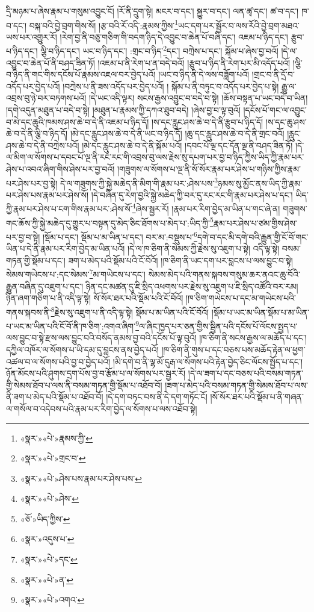 དྲི་མཉམ་པ་ཞེས་རྣམ་པ་གསུམ་འབྱུང་ངོ། །རོ་ནི་དྲུག་སྟེ། མངར་བ་དང་། སྐྱུར་བ་དང་། ལན་ཚྭ་དང་། ཚ་བ་དང་། ཁ་བ་དང་། བསྐ་བའི་བྱེ་བྲག་གིས་སོ། །རྩ་བའི་རོ་འདི་:རྣམས་ཀྱིས་\footnote{«སྣར་»«པེ་»རྣམས་ཀྱི་}ཡང་དག་པར་སྦྱོར་བ་ལས་རོའི་བྱེ་བྲག་མཐའ་ཡས་པར་འགྱུར་རོ། །རེག་བྱ་ནི་བཅུ་གཅིག་གི་བདག་ཉིད་དེ་འབྱུང་བ་ཆེན་པོ་བཞི་དང་། འཇམ་པ་ཉིད་དང་། རྩུབ་པ་ཉིད་དང་། ལྕི་བ་ཉིད་དང་། ཡང་བ་ཉིད་དང་། :གྲང་བ་ཉིད་\footnote{«སྣར་»«པེ་»གྲང་བ་}དང་། བཀྲེས་པ་དང་། སྐོམ་པ་ཞེས་བྱ་བའོ། །དེ་ལ་འབྱུང་བ་ཆེན་པོ་ནི་བཤད་ཟིན་ཏོ། །འཇམ་པ་ནི་རེག་པ་ན་བདེ་བའོ། །རྩུབ་པ་ཉིད་ནི་རེག་པར་མི་འདོད་པའོ། །ལྕི་བ་ཉིད་ནི་གང་གིས་དངོས་པོ་རྣམས་འཇལ་བར་བྱེད་པའོ། །ཡང་བ་ཉིད་ནི་དེ་ལས་བཟློག་པའོ། །གྲང་བ་ནི་དྲོ་བ་འདོད་པར་བྱེད་པའོ། །བཀྲེས་པ་ནི་ཟས་འདོད་པར་བྱེད་པའོ། །
སྐོམ་པ་ནི་བཏུང་བ་འདོད་པར་བྱེད་པ་སྟེ། རྒྱུ་ལ་འབྲས་བུ་ཉེ་བར་བཏགས་པའོ། །དེ་ཡང་འདི་ལྟར། སངས་རྒྱས་འབྱུང་བ་བདེ་བ་སྟེ། །ཆོས་བསྟན་པ་ཡང་བདེ་བ་ཡིན། །དགེ་འདུན་མཐུན་པ་བདེ་བ་སྟེ། །མཐུན་པ་རྣམས་ཀྱི་དཀའ་ཐུབ་བདེ། །ཞེས་བྱ་བ་ལྟ་བུའོ། །དངོས་པོ་གང་ལ་འབྱུང་བ་མེ་དང་ཆུའི་ཁམས་ཤས་ཆེ་བ་དེ་ནི་འཇམ་པ་ཉིད་དོ། །ས་དང་རླུང་ཤས་ཆེ་བ་དེ་ནི་རྩུབ་པ་ཉིད་དོ། །ས་དང་ཆུ་ཤས་ཆེ་བ་དེ་ནི་ལྕི་བ་ཉིད་དོ། །མེ་དང་རླུང་ཤས་ཆེ་བ་དེ་ནི་ཡང་བ་ཉིད་དོ། །ཆུ་དང་རླུང་ཤས་ཆེ་བ་དེ་ནི་གྲང་བའོ། །རླུང་ཤས་ཆེ་བ་དེ་ནི་བཀྲེས་པའོ། །མེ་དང་རླུང་ཤས་ཆེ་བ་དེ་ནི་སྐོམ་པའོ། །དབང་པོ་ལྔ་དང་དོན་ལྔ་ནི་བཤད་ཟིན་ཏོ། །དེ་ལ་མིག་ལ་སོགས་པ་དབང་པོ་ལྔ་ནི་རང་རང་གི་འབྲས་བུ་ལས་རྗེས་སུ་དཔག་པར་བྱ་བ་ཉིད་ཀྱིས་ཡིད་ཀྱི་རྣམ་པར་ཤེས་པ་འབའ་ཞིག་གིས་ཤེས་པར་བྱ་བའོ། །གཟུགས་ལ་སོགས་པ་ལྔ་ནི་སོ་སོར་རྣམ་པར་ཤེས་པ་གཉིས་ཀྱིས་རྣམ་པར་ཤེས་པར་བྱ་སྟེ། དེ་ལ་གཟུགས་ཀྱི་སྐྱེ་མཆེད་ནི་མིག་གི་རྣམ་པར་:ཤེས་པས་\footnote{«སྣར་»«པེ་»ཤེས་པས་རྣམ་པར་ཤེས་པས་}ཉམས་སུ་མྱོང་ནས་ཡིད་ཀྱི་རྣམ་པར་ཤེས་པས་རྣམ་པར་ཤེས་སོ། །དེ་བཞིན་དུ་རེག་བྱའི་སྐྱེ་མཆེད་ཀྱི་བར་དུ་རང་རང་གི་རྣམ་པར་ཤེས་པ་དང་། ཡིད་ཀྱི་རྣམ་པར་ཤེས་པ་ངག་གིས་རྣམ་པར་:ཤེས་སོ་\footnote{«སྣར་»«པེ་»ཤེས་}ཞེས་སྦྱར་རོ། །རྣམ་པར་རིག་བྱེད་མ་ཡིན་པ་གང་ཞེ་ན། གཟུགས་གང་ཆོས་ཀྱི་སྐྱེ་མཆེད་དུ་གྱུར་པ་བསྟན་དུ་མེད་ཅིང་ཐོགས་པ་མེད་པ་:ཡིད་ཀྱི་\footnote{«ཅོ་»ཡིད་ཀྱིས་}རྣམ་པར་ཤེས་པ་ཙམ་གྱིས་ཤེས་པར་བྱ་བ་སྟེ། །སྡོམ་པ་དང་། སྡོམ་པ་མ་ཡིན་པ་དང་། བར་མ་:བསྡུས་པ་\footnote{«སྣར་»འདུས་པ་}དགེ་བ་དང་མི་དགེ་བའི་རྒྱུན་གྱི་ངོ་བོ་གང་ཡིན་པ་དེ་ནི་རྣམ་པར་རིག་བྱེད་མ་ཡིན་པའོ། །དེ་ལ་ཁ་ཅིག་ནི་སེམས་ཀྱི་རྗེས་སུ་འཇུག་པ་སྟེ། འདི་ལྟ་སྟེ། བསམ་གཏན་གྱི་སྡོམ་པ་དང་། ཟག་པ་མེད་པའི་སྡོམ་པའི་ངོ་བོའོ། །ཁ་ཅིག་ནི་ཡང་དག་པར་བླངས་པ་ལས་བྱུང་བ་སྟེ། སེམས་གཡེངས་པ་:དང་སེམས་\footnote{«སྣར་»«པེ་»དང་}མ་གཡེངས་པ་དང་། སེམས་མེད་པའི་གནས་སྐབས་གསུམ་ཆར་ནའང་ཆུ་བོའི་རྒྱུན་བཞིན་དུ་འཇུག་པ་དང་། ཉིན་དང་མཚན་དུ་ཇི་སྲིད་འཕགས་པར་རྗེས་སུ་འཇུག་པ་ཇི་སྲིད་འཚོའི་བར་རམ། ཉིན་ཞག་གཅིག་པ་ནི་འདི་ལྟ་སྟེ། སོ་སོར་ཐར་པའི་སྡོམ་པའི་ངོ་བོའོ། །ཁ་ཅིག་གཡེངས་པ་དང་མ་གཡེངས་པའི་གནས་སྐབས་ནི་\footnote{«སྣར་»«པེ་»ན་}རྗེས་སུ་འཇུག་པ་ནི་འདི་ལྟ་སྟེ། སྡོམ་པ་མ་ཡིན་པའི་ངོ་བོའོ། །སྡོམ་པ་ཡང་མ་ཡིན་སྡོམ་པ་མ་ཡིན་པ་ཡང་མ་ཡིན་པའི་ངོ་བོ་ནི་ཁ་ཅིག་:འགའ་ཞིག་\footnote{«སྣར་»«པེ་»འགའ་}ལ་ཞིང་ཁྱད་པར་ཅན་གྱིས་སྦྱིན་པའི་དངོས་པོ་ལོངས་སྤྱད་པ་ལས་བྱུང་བ་སྟེ་རྫས་ལས་བྱུང་བའི་བསོད་ནམས་བྱ་བའི་དངོས་པོ་ལྟ་བུའོ། །ཁ་ཅིག་ནི་སངས་རྒྱས་ལ་མཆོད་པ་དང་། དཀྱིལ་འཁོར་ལ་སོགས་པ་ཡི་དམ་དུ་བླངས་ནས་བྱེད་པའོ། །ཁ་ཅིག་ནི་གུས་པ་དང་བཅས་པས་མཆོད་རྟེན་ལ་ཕྱག་འཚལ་བ་ལ་སོགས་པའི་བྱ་བ་བྱེད་པའོ། །མི་དགེ་བ་ནི་ལྷ་མོ་དུརྒ་ལ་སོགས་པའི་རྟེན་བྱེད་ཅིང་ལོངས་སྤྱོད་པ་དང་། ཉོན་མོངས་པའི་ཤུགས་དྲག་པོས་བྱ་བ་རྩོམ་པ་ལ་སོགས་པར་སྦྱར་རོ། །དེ་ལ་ཟག་པ་དང་བཅས་པའི་བསམ་གཏན་གྱི་སེམས་ཐོབ་པ་ལས་ནི་བསམ་གཏན་གྱི་སྡོམ་པ་འཐོབ་བོ། །ཟག་པ་མེད་པའི་བསམ་གཏན་གྱི་སེམས་ཐོབ་པ་ལས་ནི་ཟག་པ་མེད་པའི་སྡོམ་པ་འཐོབ་བོ། །དེ་དག་བཏང་བས་ནི་དེ་དག་གཏོང་ངོ། །སོ་སོར་ཐར་པའི་སྡོམ་པ་ནི་གཞན་ལ་གསོལ་བ་འདེབས་པའི་རྣམ་པར་རིག་བྱེད་ལ་སོགས་པ་ལས་འཐོབ་སྟེ། 